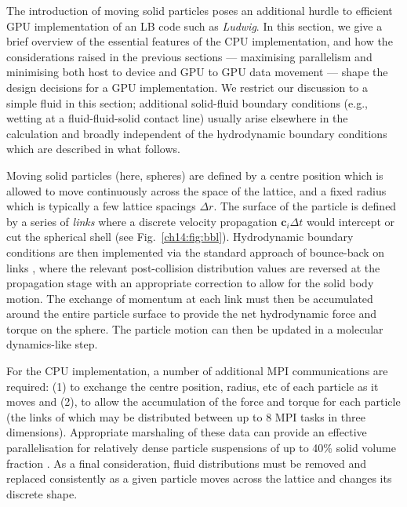 

The introduction of moving solid particles poses an additional hurdle
to efficient GPU implementation of an LB code such as \textit{Ludwig}.
In this section, we give a brief overview of the essential features
of the CPU implementation, and how the considerations raised in the
previous sections --- maximising parallelism and minimising both
host to device and GPU to GPU data movement --- shape the design decisions
for a GPU implementation. We restrict our discussion to a simple fluid
in this section; additional solid-fluid boundary conditions (e.g.,
wetting at a fluid-fluid-solid contact line) usually arise elsewhere
in the calculation and broadly independent of the hydrodynamic boundary
conditions which are described in what follows.

Moving solid particles (here, spheres) are defined by a centre position
which is allowed to move continuously across the space of the lattice,
and a fixed radius which is typically a few lattice spacings $\Delta r$.
The surface of the particle is defined by a series of \textit{links}
where a discrete velocity propagation $\mathbf{c}_i \Delta t$ would
intercept or cut the spherical shell (see Fig.~\ref{ch14:fig:bbl}).
Hydrodynamic boundary conditions are then implemented via the standard
approach of bounce-back on links \cite{ladd1994, nguyen2002}, where the
relevant post-collision distribution values are reversed at the
propagation stage with an appropriate correction to allow for the
solid body motion. The exchange of momentum at each link must then be
accumulated around the entire particle surface to provide the net
hydrodynamic force
and torque on the sphere. The particle motion can then be updated in a
molecular dynamics-like step.

For the CPU implementation, a number of additional MPI communications
are required: (1) to exchange the centre position, radius, etc of each
particle as it moves and (2), to allow the accumulation of the force
and torque for each particle (the links of which may be distributed
between up to 8 MPI tasks in three dimensions). Appropriate marshaling
of these data can provide an effective parallelisation for relatively
dense particle suspensions of up to  40\% solid volume fraction
\cite{stratford2008}. As a final consideration, fluid distributions
must be removed and replaced consistently as a given particle moves
across the lattice and changes its discrete shape.

